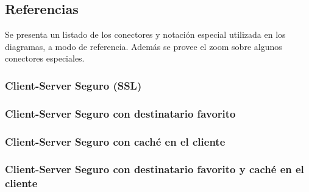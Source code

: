 \subsection{Referencias}

Se presenta un listado de los conectores y notación especial utilizada en los diagramas, a modo de referencia. Además se provee el zoom sobre algunos conectores especiales.


\subsubsection{Client-Server Seguro (SSL)}



\subsubsection{Client-Server Seguro con destinatario favorito}


\subsubsection{Client-Server Seguro con caché en el cliente}


\subsubsection{Client-Server Seguro con destinatario favorito y caché en el cliente}

